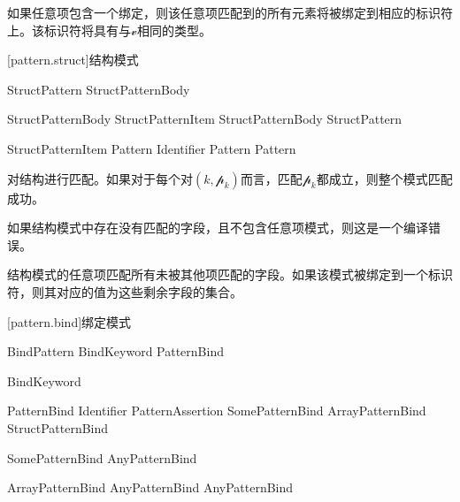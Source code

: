 \pnum
如果任意项包含一个绑定，则该任意项匹配到的所有元素将被绑定到相应的标识符上。该标识符将具有与$\mathcal{v}$相同的类型。

[pattern.struct]{结构模式}

\begin{bnf}{StructPattern}
    \terminal{(} \terminal{)} \br
    \terminal{(} StructPatternBody \terminal{,}\bnfq \terminal{)}
\end{bnf}

\begin{bnf}{StructPatternBody}
    StructPatternItem \br
    StructPatternBody \terminal{,} StructPattern
\end{bnf}

\begin{bnf}{StructPatternItem}
    Pattern \br
    Identifier \terminal{:} Pattern \br
     Pattern\bnfq
\end{bnf}

\pnum
{}对结构进行匹配。如果对于每个对$(k, \mathcal{p}_k)$而言，匹配$\mathcal{p}_k$都成立，则整个模式匹配成功。

\pnum
如果结构模式中存在没有匹配的字段，且不包含任意项模式，则这是一个编译错误。

\pnum
结构模式的任意项匹配所有未被其他项匹配的字段。如果该模式被绑定到一个标识符，则其对应的值为这些剩余字段的集合。

[pattern.bind]{绑定模式}

\begin{bnf}{BindPattern}
    BindKeyword PatternBind
\end{bnf}

\begin{bnf}{BindKeyword}
     \br
      \br
     
\end{bnf}

\begin{bnf}{PatternBind}
    Identifier PatternAssertion \br
    SomePatternBind \br
    ArrayPatternBind \br
    StructPatternBind
\end{bnf}

\begin{bnf}{SomePatternBind}
     AnyPatternBind
\end{bnf}

\begin{bnf}{ArrayPatternBind}
    \terminal{[} AnyPatternBind \bnflp\terminal{,} AnyPatternBind\bnfrp\bnfs \terminal{]}
\end{bnf}

